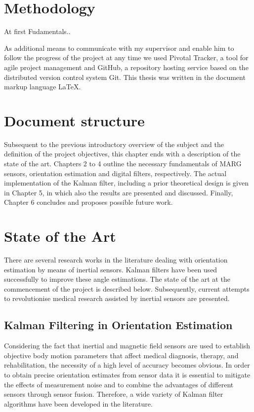 \section{Methodology}

At first Fudamentals..

As additional means to communicate with my supervisor and enable him to follow the progress of the project at any time we used Pivotal Tracker, a tool for agile project management and GitHub, a repository hosting service based on the distributed version control system Git. This thesis was written in the document markup language \LaTeX{}.

\section{Document structure}

Subsequent to the previous introductory overview of the subject and the definition of the project objectives, this chapter ends with a description of the state of the art. Chapters 2 to 4 outline the necessary fundamentals of MARG sensors, orientation estimation and digital filters, respectively. The actual implementation of the Kalman filter, including a prior theoretical design is given in Chapter 5, in which also the results are presented and discussed. Finally, Chapter 6 concludes and proposes possible future work.

\section{State of the Art}\label{sec:state_of_the_art}

There are several research works in the literature dealing with orientation estimation by means of inertial sensors. Kalman filters have been used successfully to improve these angle estimations. The state of the art at the commencement of the project is described below. Subsequently, current attempts to revolutionise medical research assisted by inertial sensors are presented.

\subsection{Kalman Filtering in Orientation Estimation}

Considering the fact that inertial and magnetic field sensors are used to establish objective body motion parameters that affect medical diagnosis, therapy, and rehabilitation, the necessity of a high level of accuracy becomes obvious. In order to obtain precise orientation estimates from sensor data it is essential to mitigate the effects of measurement noise and to combine the advantages of different  sensors through sensor fusion. Therefore, a wide variety of Kalman filter algorithms have been developed in the literature.

